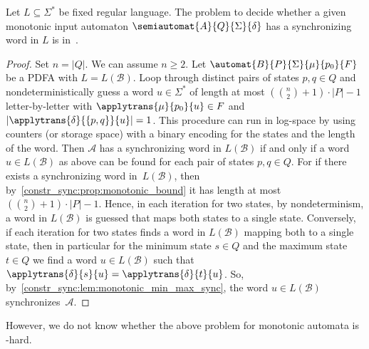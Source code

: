\begin{theorem}
	\label{constr_sync:thm:monotonic_in_NL}	
	Let $L \subseteq \Sigma^*$ be fixed regular language. The problem to decide whether a given monotonic input automaton $\semiautomat{A}{Q}{\Sigma}{\delta}$ 
	has a synchronizing word in $L$ is in~\NL.
\end{theorem}
\begin{proof}
	Set $n = |Q|$. We can assume $n \ge 2$.
	Let $\automat{B}{P}{\Sigma}{\mu}{p_0}{F}$ be a PDFA
	with $L = L(\mathcal B)$. 
	Loop through distinct pairs of states
	$p, q \in Q$ and nondeterministically guess a word $u \in \Sigma^*$ of length at most $\left( \binom{n}{2} + 1 \right) \cdot |P| - 1$
	letter-by-letter %
	with $\applytrans{\mu}{p_0}{u} \in F$ and $|\applytrans{\delta}{\{p,q\}}{u}| = 1$.
	This procedure can run in log-space by using counters (or storage space) with a binary encoding
	for the states and the length of the word.
	Then $\mathcal A$ has a synchronizing word  in $L(\mathcal B)$
	if and only if a word $u \in L(\mathcal B)$ as above
	can be found for each pair of states $p, q \in Q$.
	For if there exists a synchronizing word in~$L(\mathcal B)$,
	then by~\cref{constr_sync:prop:monotonic_bound} it has length at most $\left( \binom{n}{2} + 1 \right) \cdot |P| - 1$.
	Hence, in each iteration for two states, by nondeterminism,
	a word in $L(\mathcal B)$ is guessed that maps both states to a single 
	state.
	Conversely, if each iteration for two states finds a word in $L(\mathcal B)$
	mapping both to a single state,
	then in particular for
	the minimum state $s \in Q$ and the maximum state $t \in Q$
	we find a word $u \in L(\mathcal B)$ such that $\applytrans{\delta}{s}{u} = \applytrans{\delta}{t}{u}$.
	So, by~\cref{constr_sync:lem:monotonic_min_max_sync},
	the word $u \in L(\mathcal B)$ synchronizes~$\mathcal A$. 	
\end{proof} 

However, we do not know whether the above problem for monotonic automata 
is \NL-hard.